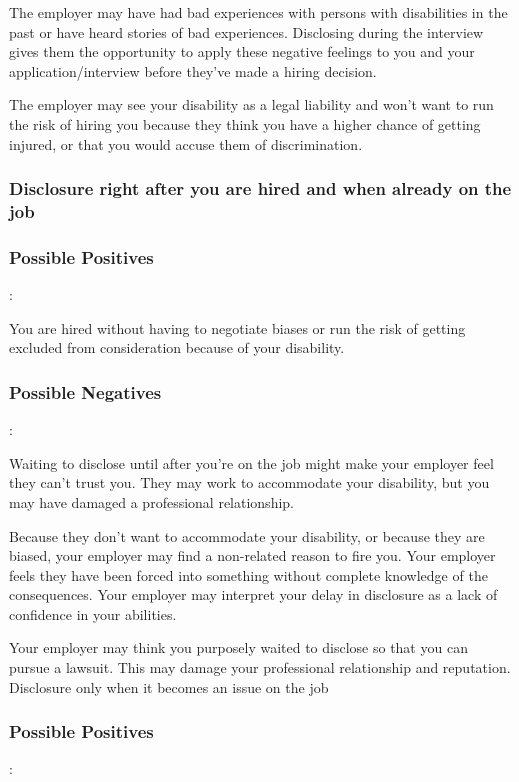 The employer may have had bad experiences with persons with disabilities in the past or have heard stories of bad experiences. Disclosing during the interview gives them the opportunity to apply these negative feelings to you and your application/interview before they've made a hiring decision.

The employer may see your disability as a legal liability and won't want to run the risk of hiring you because they think you have a higher chance of getting injured, or that you would accuse them of discrimination.

\subsubsection*{Disclosure right after you are hired and when already on the job}

\subsubsection*{Possible Positives}:

You are hired without having to negotiate biases or run the risk of getting excluded from consideration because of your disability.

\subsubsection*{Possible Negatives}:

Waiting to disclose until after you're on the job might make your employer feel they can't trust you. They may work to accommodate your disability, but you may have damaged a professional relationship.

Because they don't want to accommodate your disability, or because they are biased, your employer may find a non-related reason to fire you.
Your employer feels they have been forced into something without complete knowledge of the consequences. Your employer may interpret your delay in disclosure as a lack of confidence in your abilities.

Your employer may think you purposely waited to disclose so that you can pursue a lawsuit. This may damage your professional relationship and reputation.
Disclosure only when it becomes an issue on the job

\subsubsection*{Possible Positives}:

